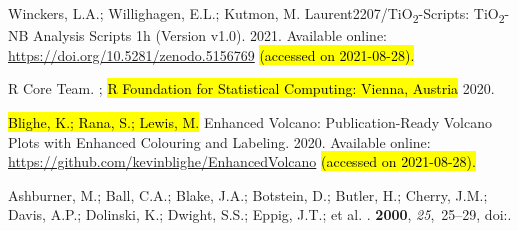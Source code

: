 \documentclass[ijms,article,accept,moreauthors,pdftex]{Definitions/mdpi}
\begin{document}
\begin{thebibliography}{999}
Winckers, L.A.; Willighagen, E.L.; Kutmon, M.
\newblock Laurent2207/TiO\textsubscript{2}-Scripts: TiO\textsubscript{2}-NB Analysis Scripts 1h (Version v1.0).  2021.
\newblock Available online: \url{https://doi.org/10.5281/zenodo.5156769} \hl{(accessed on 2021-08-28). } %

{R Core Team}.
;
\newblock \hl{R Foundation for Statistical Computing: Vienna, Austria} %
  2020.

\hl{Blighe, K.; Rana, S.; Lewis, M.} %
\newblock Enhanced Volcano: Publication-Ready Volcano Plots with Enhanced
  Colouring and Labeling.   2020.
\newblock Available online: \url{https://github.com/kevinblighe/EnhancedVolcano} \hl{(accessed on 2021-08-28). } %

Ashburner, M.; Ball, C.A.; Blake, J.A.; Botstein, D.; Butler, H.; Cherry, J.M.;
  Davis, A.P.; Dolinski, K.; Dwight, S.S.; Eppig, J.T.; et al.
.
 {\bf 2000}, {\em 25},~25--29,
\newblock
  doi:{\href{https://doi.org/10.1038/75556}{}}.


\end{thebibliography}
\end{document}
